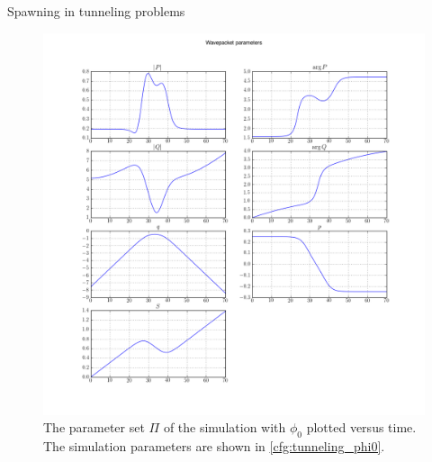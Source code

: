 \begin{chapter}{Spawning in tunneling problems}
\begin{figure}[h!]
  \centering
  \includegraphics[width=\the\linewidth]{./figures/tunnel_basic/parameters_phi0.png}
  \caption[The parameter set $\Pi$ of the simulation with $\phi_0$]
  {The parameter set $\Pi$ of the simulation with $\phi_0$ plotted versus time.
  The simulation parameters are shown in \ref{cfg:tunneling_phi0}.}
\end{figure}


\end{chapter}
